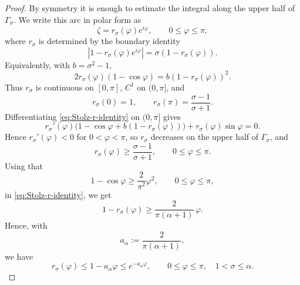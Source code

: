 \documentclass[11pt]{amsart}
\numberwithin{equation}{section}
\theoremstyle{definition}
\theoremstyle{plain}
\begin{document}
\begin{proof}
By symmetry it is enough to estimate the integral along the upper half of \(\Gamma_\sigma\).
We write this arc in polar form as
\[
        \zeta=r_\sigma(\varphi)e^{i\varphi},
        \qquad 0\le \varphi\le \pi ,
\]
where \(r_\sigma\) is determined by the boundary identity
\[
        |1-r_\sigma(\varphi)e^{i\varphi}|
        =
        \sigma(1-r_\sigma(\varphi)).
\]
Equivalently, with \(b=\sigma^2-1\),
\begin{equation}\label{eq:Stolz-r-identity}
        2r_\sigma(\varphi)(1-\cos\varphi)
        =
        b(1-r_\sigma(\varphi))^2 .
\end{equation}
Thus \(r_\sigma\) is continuous on \([0,\pi]\), \(C^1\) on \((0,\pi]\), and
\[
        r_\sigma(0)=1,
        \qquad
        r_\sigma(\pi)=\frac{\sigma-1}{\sigma+1}.
\]
Differentiating \eqref{eq:Stolz-r-identity} on \((0,\pi]\) gives
\[
        r_\sigma'(\varphi)
        \bigl(1-\cos\varphi+b(1-r_\sigma(\varphi))\bigr)
        +r_\sigma(\varphi)\sin\varphi=0.
\]
Hence \(r_\sigma'(\varphi)<0\) for \(0<\varphi<\pi\), so \(r_\sigma\)
decreases on the upper half of \(\Gamma_\sigma\), 
and
\[
        r_\sigma(\varphi)\ge \frac{\sigma-1}{\sigma+1},
        \qquad 0\le\varphi\le\pi .
\]
Using that 
\[
        1-\cos\varphi\ge \frac{2}{\pi^2}\varphi^2,
        \qquad 0\le\varphi\le\pi ,
\]
in \eqref{eq:Stolz-r-identity}, we get
\[
        1-r_\sigma(\varphi)
        \ge
        \frac{2}{\pi(\alpha+1)}\,\varphi .
\]
Hence, with
\[
        a_\alpha:=\frac{2}{\pi(\alpha+1)},
\]
we have
\begin{equation}\label{eq:Stolz-r-exp-uniform}
        r_\sigma(\varphi)
        \le
        1-a_\alpha\varphi
        \le
        e^{-a_\alpha\varphi},
        \qquad 0\le\varphi\le\pi,\quad 1<\sigma\le\alpha .
\end{equation}


\end{proof}
\end{document}
